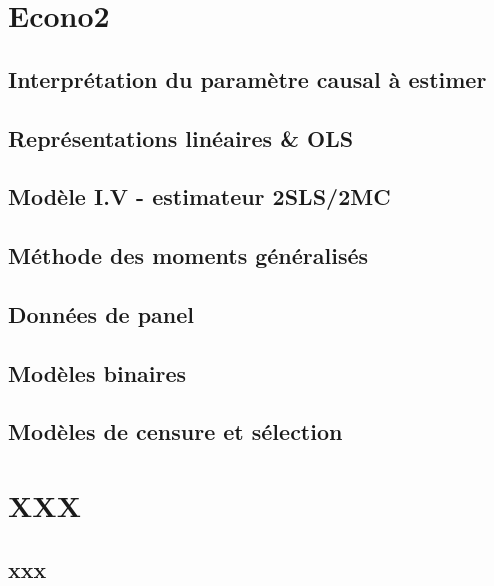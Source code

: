 \documentclass[12pt, french]{article}
\begin{document}

\newpage

\pagestyle{fancy}
\fancyhead[L]{}
\fancyhead[R]{}
\tableofcontents
\break

\pagestyle{fancy}
\fancyhead[L]{\leftmark}
\fancyhead[R]{}


\section{Econo2}

\subsection{Interprétation du paramètre causal à estimer}

\subsection{Représentations linéaires \& OLS}

\newpage
\subsection{Modèle I.V - estimateur 2SLS/2MC}

\subsection{Méthode des moments généralisés}

\newpage
\subsection{Données de panel}

\newpage
\subsection{Modèles binaires}

\newpage
\subsection{Modèles de censure et sélection}


\newpage

\section{XXX}
%
\subsection{xxx}
%
\end{document}
